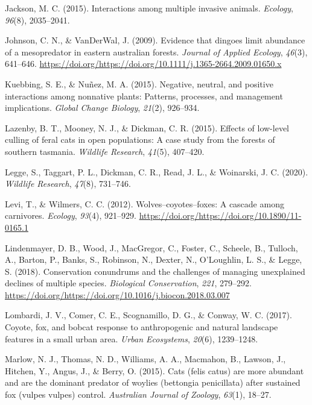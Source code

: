 \documentclass[]{elsarticle} %
\begin{document}
\leavevmode\hypertarget{ref-jackson2015}{}%
Jackson, M. C. (2015). Interactions among multiple invasive animals. \emph{Ecology}, \emph{96}(8), 2035--2041.

\leavevmode\hypertarget{ref-https:ux2fux2fdoi.orgux2f10.1111ux2fj.1365-2664.2009.01650.x}{}%
Johnson, C. N., \& VanDerWal, J. (2009). Evidence that dingoes limit abundance of a mesopredator in eastern australian forests. \emph{Journal of Applied Ecology}, \emph{46}(3), 641--646. \url{https://doi.org/https://doi.org/10.1111/j.1365-2664.2009.01650.x}

\leavevmode\hypertarget{ref-kuebbing2015}{}%
Kuebbing, S. E., \& Nuñez, M. A. (2015). Negative, neutral, and positive interactions among nonnative plants: Patterns, processes, and management implications. \emph{Global Change Biology}, \emph{21}(2), 926--934.

\leavevmode\hypertarget{ref-lazenby2015}{}%
Lazenby, B. T., Mooney, N. J., \& Dickman, C. R. (2015). Effects of low-level culling of feral cats in open populations: A case study from the forests of southern tasmania. \emph{Wildlife Research}, \emph{41}(5), 407--420.

\leavevmode\hypertarget{ref-legge2020}{}%
Legge, S., Taggart, P. L., Dickman, C. R., Read, J. L., \& Woinarski, J. C. (2020). \emph{Wildlife Research}, \emph{47}(8), 731--746.

\leavevmode\hypertarget{ref-https:ux2fux2fdoi.orgux2f10.1890ux2f11-0165.1}{}%
Levi, T., \& Wilmers, C. C. (2012). Wolves--coyotes--foxes: A cascade among carnivores. \emph{Ecology}, \emph{93}(4), 921--929. \url{https://doi.org/https://doi.org/10.1890/11-0165.1}

\leavevmode\hypertarget{ref-LINDENMAYER2018279}{}%
Lindenmayer, D. B., Wood, J., MacGregor, C., Foster, C., Scheele, B., Tulloch, A., Barton, P., Banks, S., Robinson, N., Dexter, N., O'Loughlin, L. S., \& Legge, S. (2018). Conservation conundrums and the challenges of managing unexplained declines of multiple species. \emph{Biological Conservation}, \emph{221}, 279--292. \url{https://doi.org/https://doi.org/10.1016/j.biocon.2018.03.007}

\leavevmode\hypertarget{ref-lombardi2017coyote}{}%
Lombardi, J. V., Comer, C. E., Scognamillo, D. G., \& Conway, W. C. (2017). Coyote, fox, and bobcat response to anthropogenic and natural landscape features in a small urban area. \emph{Urban Ecosystems}, \emph{20}(6), 1239--1248.

\leavevmode\hypertarget{ref-marlow2015}{}%
Marlow, N. J., Thomas, N. D., Williams, A. A., Macmahon, B., Lawson, J., Hitchen, Y., Angus, J., \& Berry, O. (2015). Cats (felis catus) are more abundant and are the dominant predator of woylies (bettongia penicillata) after sustained fox (vulpes vulpes) control. \emph{Australian Journal of Zoology}, \emph{63}(1), 18--27.
\end{document}
